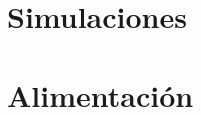 \section{Simulaciones}
\resetallcounters

\clearpage

\section{Alimentación}
\resetallcounters

\clearpage

